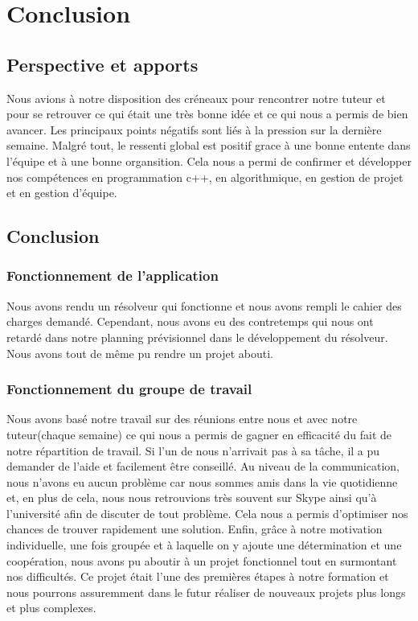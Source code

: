 \documentclass{article}
\begin{document}
\section{\LARGE Conclusion}

    \subsection{\Large Perspective et apports}
    \hspace{0.5cm} Nous avions à notre disposition des créneaux pour rencontrer notre tuteur et pour se retrouver ce qui était une très bonne idée et ce qui nous a permis de bien avancer. \newline
    Les principaux points négatifs sont liés à la pression sur la dernière semaine.  Malgré tout, le ressenti global est positif grace à une bonne entente dans l'équipe et à une bonne organsition. Cela nous a permi de confirmer et développer nos compétences en programmation c++, en algorithmique, en gestion de projet et en gestion d'équipe.
    
    \subsection{\Large Conclusion}
        \subsubsection{\large Fonctionnement de l’application}
        \hspace{0.5cm} Nous avons rendu un résolveur qui fonctionne et nous avons rempli le cahier des charges demandé. Cependant, nous avons eu des contretemps qui nous ont retardé dans notre planning prévisionnel dans le développement du résolveur. Nous avons tout de même pu rendre un projet abouti.
        
        \subsubsection{\large Fonctionnement du groupe de travail} 
        \hspace{0.5cm}Nous avons basé notre travail sur des réunions entre nous et avec notre tuteur(chaque semaine) ce qui nous a permis de gagner en efficacité du fait de notre répartition de travail. Si l’un de nous n’arrivait pas à sa tâche, il a pu demander de l’aide et facilement être conseillé. 
        Au niveau de la communication, nous n’avons eu aucun problème car nous sommes amis dans la vie quotidienne et, en plus de cela, nous nous retrouvions très souvent sur Skype ainsi qu’à l’université afin de discuter de tout problème. Cela nous a permis d'optimiser nos chances de trouver rapidement une solution.
        Enfin, grâce à notre motivation individuelle, une fois groupée et à laquelle on y ajoute une détermination et une coopération, nous avons pu aboutir à un projet fonctionnel tout en surmontant nos difficultés. Ce projet était l'une des premières étapes à notre formation et nous pourrons assuremment dans le futur réaliser de nouveaux projets plus longs et plus complexes.
    
\end{document}
